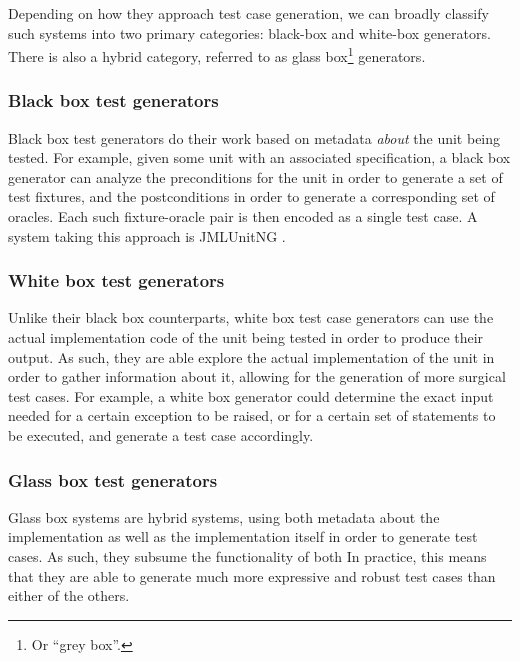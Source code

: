 \documentclass{article}
\newcommand{\tmem}[1]{{\em #1\/}}
\begin{document}
Depending on how they approach test case generation, we can broadly classify
such systems into two primary categories: black-box and white-box generators.
There is also a hybrid category, referred to as glass box{\footnote{Or ``grey
box''.}} generators.



\subsubsection{Black box test generators}

Black box test generators do their work based on metadata {\tmem{about}} the
unit being tested. For example, given some unit with an associated
specification, a black box generator can analyze the preconditions for the
unit in order to generate a set of test fixtures, and the postconditions in
order to generate a corresponding set of oracles. Each such fixture-oracle
pair is then encoded as a single test case. A system taking this approach is
JMLUnitNG {\cite{JMLUnitNGWebsite}}.



\subsubsection{White box test generators}

Unlike their black box counterparts, white box test case generators can use
the actual implementation code of the unit being tested in order to produce
their output. As such, they are able explore the actual implementation of the
unit in order to gather information about it, allowing for the generation of
more surgical test cases. For example, a white box generator could determine
the exact input needed for a certain exception to be raised, or for a certain
set of statements to be executed, and generate a test case accordingly.



\subsubsection{Glass box test generators}

Glass box systems are hybrid systems, using both metadata about the
implementation as well as the implementation itself in order to generate test
cases. As such, they subsume the functionality of both In practice, this means
that they are able to generate much more expressive and robust test cases than
either of the others.
\end{document}
